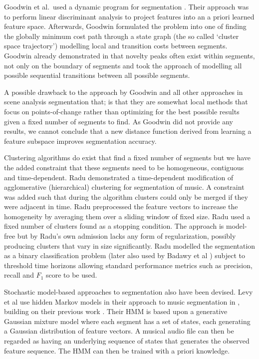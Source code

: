 \documentclass[twocolumn]{article}
\begin{document}
	Goodwin et al.\ used a dynamic program for segmentation \citep{goodwin2004dynamic}. Their approach was to perform linear discriminant analysis to project features into an a priori learned feature space. Afterwards, Goodwin formulated the problem into one of finding the globally minimum cost path through a state graph (the so called `cluster space trajectory') modelling local and transition costs between segments. Goodwin already demonstrated in \citep{goodwin2003audio} that novelty peaks often exist within segments, not only on the boundary of segments and took the approach of modelling all possible sequential transitions between all possible segments.
	
	A possible drawback to the approach by Goodwin and all other approaches in scene analysis segmentation that; is that they are somewhat local methods that focus on points-of-change rather than optimizing for the best possible results given a fixed number of segments to find. As Goodwin did not provide any results, we cannot conclude that a new distance function derived from learning a feature subspace improves segmentation accuracy. 
	
	Clustering algorithms do exist that find a fixed number of segments but we have the added constraint that these segments need to be homogeneous, contiguous and time-dependent. Radu \citep{radu} demonstrated a time-dependent modification of agglomerative (hierarchical) clustering for segmentation of music. A constraint was added such that during the algorithm clusters could only be merged if they were adjacent in time. Radu preprocessed the feature vectors to increase the homogeneity by averaging them over a sliding window of fixed size. Radu used a fixed number of clusters found as a stopping condition. The approach is model-free but by Radu's own admission lacks any form of regularization, possibly producing clusters that vary in size significantly. Radu modelled the segmentation as a binary classification problem (later also used by Badawy et al \citep{elaudio}) subject to threshold time horizons allowing standard performance metrics such as precision, recall and $F_1$ score to be used. 
	
	Stochastic model-based approaches to segmentation also have been devised. Levy et al use hidden Markov models in their approach to music segmentation in \citep{levy2008structural}, building on their previous work \citep{levy2006new, levy2006extraction}. Their HMM is based upon a generative Gaussian mixture model where each segment has a set of states, each generating a Gaussian distribution of feature vectors. A musical audio file can then be regarded as having an underlying sequence of states that generates the observed feature sequence. The HMM can then be trained with a priori knowledge. 
	
\end{document}
